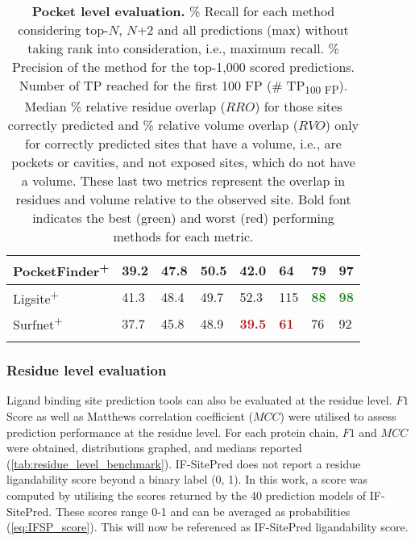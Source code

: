 \begin{landscape}
\begin{longtable}[c]{|M{27mm}|M{27mm}|M{29mm}|M{24mm}|M{27mm}|M{22mm}|M{20mm}|M{20mm}|}
PocketFinder\textsuperscript{+}  & 39.2           & 47.8             & 50.5         & 42.0             & 64          & 79     & 97     \\ \hline
Ligsite\textsuperscript{+}       & 41.3           & 48.4             & 49.7         & 52.3           & 115         & \textbf{\textcolor{forestgreen}{88}}             & \textbf{\textcolor{forestgreen}{98}}             \\ \hline
Surfnet\textsuperscript{+}       & 37.7           & 45.8             & 48.9         & \textbf{\textcolor{firebrick}{39.5}}           & \textbf{\textcolor{firebrick}{61}}                  & 76     & 92     \\ \hline
\caption[Pocket level evaluation]{\textbf{Pocket level evaluation.} \% Recall for each method considering top-$N$, $N$+2 and all predictions (max) without taking rank into consideration, i.e., maximum recall. \% Precision of the method for the top-1,000 scored predictions. Number of TP reached for the first 100 FP (\# TP\textsubscript{100 FP}). Median \% relative residue overlap ($RRO$) for those sites correctly predicted and \% relative volume overlap ($RVO$) only for correctly predicted sites that have a volume, i.e., are pockets or cavities, and not exposed sites, which do not have a volume. These last two metrics represent the overlap in residues and volume relative to the observed site. Bold font indicates the best (green) and worst (red) performing methods for each metric.}
\label{tab:pocket_level_benchmark}\\
\end{longtable}
\end{landscape}

\subsubsection{Residue level evaluation}

Ligand binding site prediction tools can also be evaluated at the residue level. $F1$ Score as well as Matthews correlation coefficient ($MCC$) were utilised to assess prediction performance at the residue level. For each protein chain, $F1$ and $MCC$ were obtained, distributions graphed, and medians reported (\autoref{tab:residue_level_benchmark}). IF-SitePred does not report a residue ligandability score beyond a binary label (0, 1). In this work, a score was computed by utilising the scores returned by the 40 prediction models of IF-SitePred. These scores range 0-1 and can be averaged as probabilities (\autoref{eq:IFSP_score}). This will now be referenced as IF-SitePred ligandability score.

